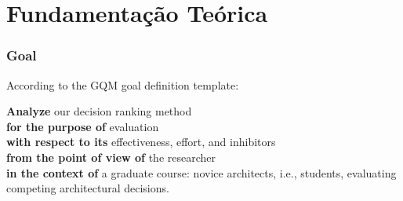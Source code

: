 \documentclass{beamer}
\begin{document}
\section{Fundamentação Teórica}
\label{sub:goal}
\begin{frame} \frametitle{Goal}


According to the GQM goal definition template:

\vspace{0.2cm}
\indent \textbf{Analyze} our decision ranking method\\
\vspace{0.2cm}
\indent \textbf{for the purpose of} evaluation \\
\vspace{0.2cm}
\indent \textbf{with respect to its} effectiveness, effort,
and inhibitors \\
\vspace{0.2cm}
\indent \textbf{from the point of view of} the researcher \\
\vspace{0.2cm}
\indent \textbf{in the context of} a graduate course: 
\tiny novice architects, i.e., students, evaluating 
competing architectural decisions.
\vspace{0.2cm}

\end{frame}
\end{document}
